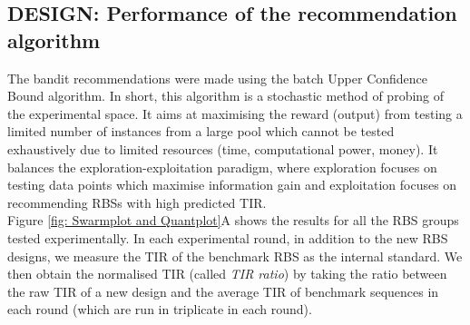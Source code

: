 \documentclass{article}
\begin{document}
\subsection{DESIGN: Performance of the recommendation algorithm}
\label{sec:ucb-results}

The bandit recommendations were made using the batch Upper Confidence Bound algorithm.
In short, this algorithm is a stochastic method of probing of the experimental space. 
It aims at maximising the reward (output) from testing a limited number of instances from a large pool which cannot be tested exhaustively due to limited resources (time, computational power, money).
It balances the exploration-exploitation paradigm, where exploration focuses on testing data points which maximise information gain and exploitation focuses on recommending RBSs with high predicted TIR.\\

Figure \ref{fig: Swarmplot and Quantplot}A shows the results for all the RBS groups tested experimentally. 
In each experimental round, in addition to the new RBS designs, we measure the TIR of the benchmark RBS as the internal standard. 
We then obtain the normalised TIR (called \textit{TIR ratio}) by taking the ratio between the raw TIR of a new design and the average TIR of benchmark sequences in each round (which are run in triplicate in each round).\\
\end{document}
